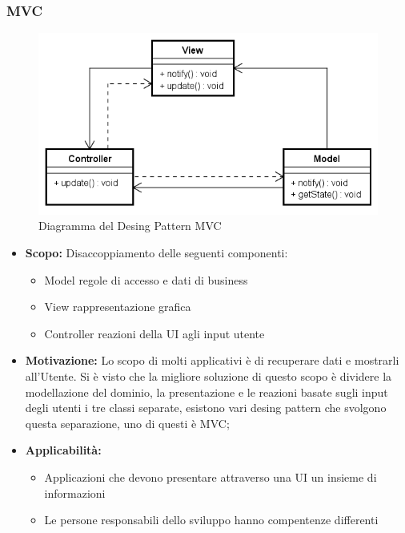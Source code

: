 \documentclass[a4paper]{article}
\begin{document}
	\subsubsection{MVC}
				\begin{figure}[H]
					\centering
					\includegraphics[scale=0.65]{immagini/ST/schemaMVC.png}
					\caption{Diagramma del Desing Pattern MVC}
				\end{figure}
            \begin{itemize}
				\item \textbf{Scopo:}
					Disaccoppiamento delle seguenti componenti:
					\begin{itemize}
						\item Model regole di accesso e dati di business
						\item View rappresentazione grafica
						\item Controller reazioni della UI agli input utente
					\end{itemize}
                \item \textbf{Motivazione:}
                	Lo scopo di molti applicativi è di recuperare dati e mostrarli all'Utente. Si è visto che la migliore soluzione di questo scopo è dividere la modellazione del dominio, la presentazione e le reazioni basate sugli input degli utenti i tre classi separate, esistono vari desing pattern che svolgono questa separazione, uno di questi è MVC; 
                \item \textbf{Applicabilità:}
					\begin{itemize}
						\item Applicazioni che devono presentare attraverso una UI un insieme di informazioni
						\item Le persone responsabili dello sviluppo hanno compentenze differenti
					\end{itemize}
                	 		
			\end{itemize}
\end{document}
